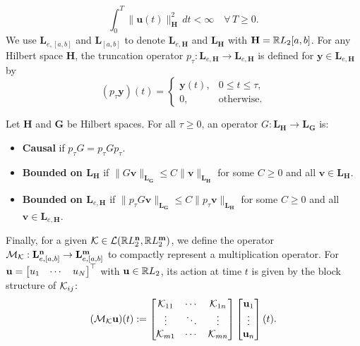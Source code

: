 \[
	\int_0^T \|\mathbf{u}(t)\|_{\mathbf{H}}^2\, dt < \infty
	\quad \forall\, T \ge 0.
\] We use $\mathbf{L}_{e,[a,b]}$ and $\mathbf{L}_{[a,b]}$ to denote $\mathbf{L}_{e,\mathbf{H}}$ and $\mathbf{L}_{\mathbf{H}}$ with $\mathbf{H} = \mathbb{R} L_2[a,b]$. For any Hilbert space $\mathbf{H}$, the truncation operator $p_\tau : \mathbf{L}_{e,\mathbf{H}} \to \mathbf{L}_{e,\mathbf{H}}$ is defined for $\mathbf{y} \in \mathbf{L}_{e,\mathbf{H}}$ by
\begin{equation*}
	(p_\tau \mathbf{y})(t) =
	\begin{cases}
		\mathbf{y}(t), & 0 \le t \le \tau, \\
		0,             & \text{otherwise}.
	\end{cases}
\end{equation*}
\begin{definition}
	Let $\mathbf{H}$ and $\mathbf{G}$ be Hilbert spaces. For all $\tau\geq0$, an operator $G : \mathbf{L}_{\mathbf{H}} \to \mathbf{L}_{\mathbf{G}}$ is:
	\begin{itemize}
		\item \textbf{Causal} if $p_\tau G = p_\tau G p_\tau$.
		\item \textbf{Bounded on $\mathbf{L}_{\mathbf{H}}$} if $\|G \mathbf{v}\|_{\mathbf{L}_{\mathbf{G}}} \le C \|\mathbf{v}\|_{\mathbf{L}_{\mathbf{H}}}$ for some $C \ge 0$ and all $\mathbf{v} \in \mathbf{L}_{\mathbf{H}}$.
		\item \textbf{Bounded on $\mathbf{L}_{e,\mathbf{H}}$} if $\|p_\tau G \mathbf{v}\|_{\mathbf{L}_{\mathbf{G}}} \le C \|p_\tau\mathbf{v}\|_{\mathbf{L}_{\mathbf{H}}}$ for some $C \ge 0$ and all $\mathbf{v} \in \mathbf{L}_{e,\mathbf{H}}$.
	\end{itemize}
\end{definition}
Finally, for a given $\mathcal{K} \in \mathcal{L}(\mathbb{R} L_2^{\mathbf{n}}, \mathbb{R} L_2^{\mathbf{m}})$, we define the operator $\mathcal{M}_{\mathcal{K}} : \mathbf{L}_{e,[a,b]}^{\mathbf{n}} \to \mathbf{L}_{e,[a,b]}^{\mathbf{m}}$ to compactly represent a multiplication operator. For $\mathbf{u} = \begin{bmatrix}u_1 & \cdots & u_N\end{bmatrix}^\top$ with $\mathbf{u} \in \mathbb{R} L_2$, its action at time $t$ is given by the block structure of $\mathcal{K}_{ij}$:
\begin{equation}
	\label{eq:block_operator_def}
	(\mathcal{M}_{\mathcal{K}} \mathbf{u})(t)
	:= \begin{bmatrix}
		\mathcal{K}_{11} & \cdots & \mathcal{K}_{1n} \\
		\vdots      & \ddots & \vdots      \\
		\mathcal{K}_{m1} & \cdots & \mathcal{K}_{mn}
	\end{bmatrix}
	\begin{bmatrix}\mathbf{u}_1 \\ \vdots \\ \mathbf{u}_n\end{bmatrix}(t).
\end{equation}

